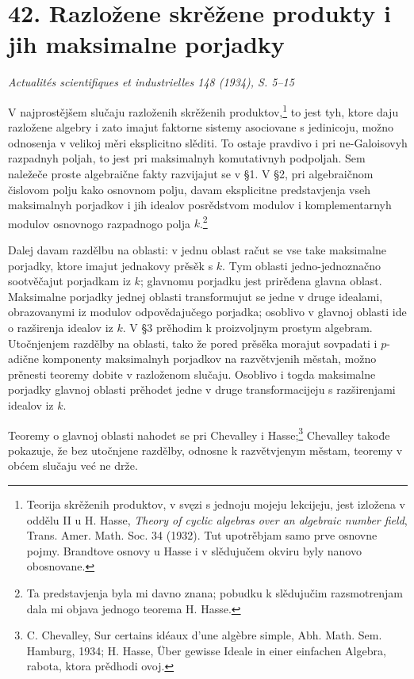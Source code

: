 \documentclass[11pt]{article}
\newcommand{\foreign}[1]{#1}
\begin{document}
\section*{42. Razložene skrěžene produkty i jih maksimalne porjadky}

\begin{center}
\emph{\foreign{Actualités scientifiques et industrielles 148 (1934), S. 5--15}}
\end{center}

V najprostějšem slučaju razloženih skrěženih produktov,\footnote{Teorija skrěženih produktov, v svęzi s jednoju mojeju lekcijeju, jest izložena v oddělu II u H. Hasse, \foreign{\emph{Theory of cyclic algebras over an algebraic number field}}, Trans. Amer. Math. Soc. 34 (1932). Tut upotrěbjam samo prve osnovne pojmy. Brandtove osnovy u Hasse i v slědujučem okviru byly nanovo obosnovane.} to jest tyh, ktore daju razložene algebry i zato imajut faktorne sistemy asociovane s jedinicoju, možno odnosenja v velikoj měri eksplicitno slěditi. To ostaje pravdivo i pri ne-Galoisovyh razpadnyh poljah, to jest pri maksimalnyh komutativnyh podpoljah. Sem naležeče proste algebraične fakty razvijajut se v §1. V §2, pri algebraičnom čislovom polju kako osnovnom polju, davam eksplicitne predstavjenja vseh maksimalnyh porjadkov i jih idealov posrědstvom modulov i komplementarnyh modulov osnovnogo razpadnogo polja \(k\).\footnote{Ta predstavjenja byla mi davno znana; pobudku k slědujučim razsmotrenjam dala mi objava jednogo teorema H. Hasse.}

Dalej davam razdělbu na oblasti: v jednu oblast račut se vse take maksimalne porjadky, ktore imajut jednakovy prěsěk s \(k\). Tym oblasti jedno-jednoznačno sootvěčajut porjadkam iz \(k\); glavnomu porjadku jest prirěđena glavna oblast. Maksimalne porjadky jednej oblasti transformujut se jedne v druge idealami, obrazovanymi iz modulov odpovědajučego porjadka; osoblivo v glavnoj oblasti ide o razširenja idealov iz \(k\). V §3 prěhodim k proizvoljnym prostym algebram. Utočnjenjem razdělby na oblasti, tako že pored prěsěka morajut sovpadati i \(p\)-adične komponenty maksimalnyh porjadkov na razvětvjenih městah, možno prěnesti teoremy dobite v razloženom slučaju. Osoblivo i togda maksimalne porjadky glavnoj oblasti prěhodet jedne v druge transformacijeju s razširenjami idealov iz \(k\).

Teoremy o glavnoj oblasti nahodet se pri Chevalley i Hasse;\footnote{C. Chevalley, \foreign{Sur certains idéaux d'une algèbre simple}, Abh. Math. Sem. Hamburg, 1934; H. Hasse, \foreign{Über gewisse Ideale in einer einfachen Algebra}, rabota, ktora prědhodi ovoj.} Chevalley takođe pokazuje, že bez utočnjene razdělby, odnosne k razvětvjenym městam, teoremy v obćem slučaju već ne drže.
\end{document}
